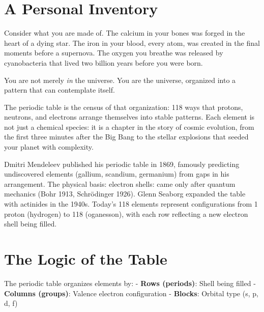 \documentclass[
  11pt,
  letterpaper,
  twoside,
  openright]{book}
\begin{document}
\section{A Personal Inventory}\label{a-personal-inventory}

Consider what you are made of. The calcium in your bones was forged in
the heart of a dying star. The iron in your blood, every atom, was
created in the final moments before a supernova. The oxygen you breathe
was released by cyanobacteria that lived two billion years before you
were born.

You are not merely \emph{in} the universe. You are the universe,
organized into a pattern that can contemplate itself.

The periodic table is the census of that organization: 118 ways that
protons, neutrons, and electrons arrange themselves into stable
patterns. Each element is not just a chemical species: it is a chapter
in the story of cosmic evolution, from the first three minutes after the
Big Bang to the stellar explosions that seeded your planet with
complexity.

\begin{tcolorbox}[enhanced jigsaw, leftrule=.75mm, title=\textcolor{quarto-callout-note-color}{\faInfo}\hspace{0.5em}{Historical Context}, bottomrule=.15mm, opacityback=0, coltitle=black, arc=.35mm, colframe=quarto-callout-note-color-frame, colbacktitle=quarto-callout-note-color!10!white, colback=white, titlerule=0mm, breakable, bottomtitle=1mm, toptitle=1mm, rightrule=.15mm, toprule=.15mm, left=2mm, opacitybacktitle=0.6]

Dmitri Mendeleev published his periodic table in 1869, famously
predicting undiscovered elements (gallium, scandium, germanium) from
gaps in his arrangement. The physical basis: electron shells: came only
after quantum mechanics (Bohr 1913, Schrödinger 1926). Glenn Seaborg
expanded the table with actinides in the 1940s. Today's 118 elements
represent configurations from 1 proton (hydrogen) to 118 (oganesson),
with each row reflecting a new electron shell being filled.

\end{tcolorbox}

\section{The Logic of the Table}\label{the-logic-of-the-table}

The periodic table organizes elements by: - \textbf{Rows (periods)}:
Shell being filled - \textbf{Columns (groups)}: Valence electron
configuration - \textbf{Blocks}: Orbital type (s, p, d, f)
\end{document}
